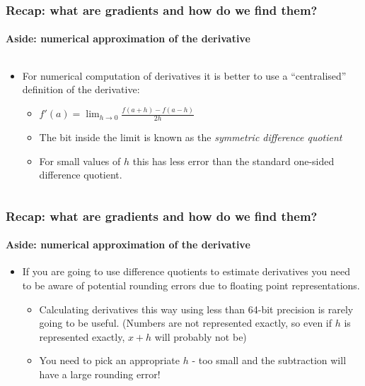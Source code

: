 \documentclass[\beamerclass]{beamer}
\begin{document}
\begin{frame}
\frametitle{Recap: what are gradients and how do we find them?}
\framesubtitle{Aside: numerical approximation of the derivative}

\begin{columns}
\begin{column}{0.65\textwidth}
\begin{itemize}
\item For numerical computation of derivatives it is better to use a ``centralised'' definition of the derivative:
\begin{itemize}
	\item<+-> $f'(a) = \lim_{h\to0} \frac{f(a+h) - f(a-h)}{2h}$
	\item<+-> The bit inside the limit is known as the \emph{symmetric difference quotient}
	\item<+-> For small values of $h$ this has less error than the standard one-sided difference quotient.
\end{itemize}
\end{itemize}

\end{column}
\begin{column}{0.35\textwidth}


\end{column}
\end{columns}
\end{frame}


\begin{frame}
\frametitle{Recap: what are gradients and how do we find them?}
\framesubtitle{Aside: numerical approximation of the derivative}
\begin{itemize}
\item<+-> If you are going to use difference quotients to estimate derivatives you need to be aware of potential rounding errors due to floating point representations.
\begin{itemize}
	\item Calculating derivatives this way using less than 64-bit precision is rarely going to be useful. (Numbers are not represented exactly, so even if $h$ is represented exactly, $x+h$ will probably not be)
	\item You need to pick an appropriate $h$ - too small and the subtraction will have a large rounding error!
\end{itemize}
\end{itemize}
\end{frame}
\end{document}
